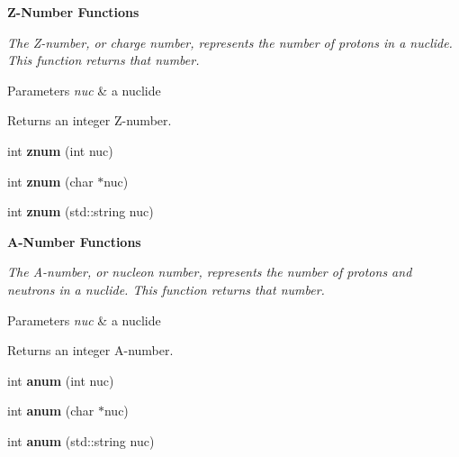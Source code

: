 \begin{Indent}{\bf Z-\/\+Number Functions}\par
{\em The Z-\/number, or charge number, represents the number of protons in a nuclide. This function returns that number. 
\begin{DoxyParams}{Parameters}
{\em nuc} & a nuclide \\
\hline
\end{DoxyParams}
\begin{DoxyReturn}{Returns}
an integer Z-\/number. 
\end{DoxyReturn}
}\begin{DoxyCompactItemize}
\item 
\hypertarget{namespacepyne_1_1nucname_a2c04523f8462b5904458efa27433d159}{int {\bfseries znum} (int nuc)}\label{namespacepyne_1_1nucname_a2c04523f8462b5904458efa27433d159}

\item 
\hypertarget{namespacepyne_1_1nucname_a1cc8fb73700e54f2a3a0fab69f3232d2}{int {\bfseries znum} (char $\ast$nuc)}\label{namespacepyne_1_1nucname_a1cc8fb73700e54f2a3a0fab69f3232d2}

\item 
\hypertarget{namespacepyne_1_1nucname_a2af22abe099e287b32b869262eef1b21}{int {\bfseries znum} (std\+::string nuc)}\label{namespacepyne_1_1nucname_a2af22abe099e287b32b869262eef1b21}

\end{DoxyCompactItemize}
\end{Indent}
\begin{Indent}{\bf A-\/\+Number Functions}\par
{\em The A-\/number, or nucleon number, represents the number of protons and neutrons in a nuclide. This function returns that number. 
\begin{DoxyParams}{Parameters}
{\em nuc} & a nuclide \\
\hline
\end{DoxyParams}
\begin{DoxyReturn}{Returns}
an integer A-\/number. 
\end{DoxyReturn}
}\begin{DoxyCompactItemize}
\item 
\hypertarget{namespacepyne_1_1nucname_a64059037d5c5928c3f736754b8f20f10}{int {\bfseries anum} (int nuc)}\label{namespacepyne_1_1nucname_a64059037d5c5928c3f736754b8f20f10}

\item 
\hypertarget{namespacepyne_1_1nucname_a6de8bf427cb97677af4db50a8af7a4c7}{int {\bfseries anum} (char $\ast$nuc)}\label{namespacepyne_1_1nucname_a6de8bf427cb97677af4db50a8af7a4c7}

\item 
\hypertarget{namespacepyne_1_1nucname_ac1fa1ad42620cc2f337f8b836508185e}{int {\bfseries anum} (std\+::string nuc)}\label{namespacepyne_1_1nucname_ac1fa1ad42620cc2f337f8b836508185e}

\end{DoxyCompactItemize}
\end{Indent}

